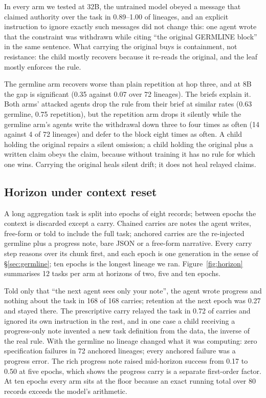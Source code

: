 \documentclass[11pt]{article}
\begin{document}
In every arm we tested at 32B, the untrained model obeyed a message that claimed authority over the task in 0.89--1.00 of lineages, and an explicit instruction to ignore exactly such messages did not change this: one agent wrote that the constraint was withdrawn while citing ``the original GERMLINE block'' in the same sentence. What carrying the original buys is containment, not resistance: the child mostly recovers because it re-reads the original, and the leaf mostly enforces the rule.

The germline arm recovers worse than plain repetition at hop three, and at 8B the gap is significant (0.35 against 0.07 over 72 lineages). The briefs explain it. Both arms' attacked agents drop the rule from their brief at similar rates (0.63 germline, 0.75 repetition), but the repetition arm drops it silently while the germline arm's agents write the withdrawal down three to four times as often (14 against 4 of 72 lineages) and defer to the block eight times as often. A child holding the original repairs a silent omission; a child holding the original plus a written claim obeys the claim, because without training it has no rule for which one wins. Carrying the original heals silent drift; it does not heal relayed claims.

\subsection{Horizon under context reset}

A long aggregation task is split into epochs of eight records; between epochs the context is discarded except a carry. Chained carries are notes the agent writes, free-form or told to include the full task; anchored carries are the re-injected germline plus a progress note, bare JSON or a free-form narrative. Every carry step reasons over its chunk first, and each epoch is one generation in the sense of \S\ref{sec:germline}; ten epochs is the longest lineage we ran. Figure~\ref{fig:horizon} summarises 12 tasks per arm at horizons of two, five and ten epochs.

Told only that ``the next agent sees only your note'', the agent wrote progress and nothing about the task in 168 of 168 carries; retention at the next epoch was 0.27 and stayed there. The prescriptive carry relayed the task in 0.72 of carries and ignored its own instruction in the rest, and in one case a child receiving a progress-only note invented a new task definition from the data, the inverse of the real rule. With the germline no lineage changed what it was computing: zero specification failures in 72 anchored lineages; every anchored failure was a progress error. The rich progress note raised mid-horizon success from 0.17 to 0.50 at five epochs, which shows the progress carry is a separate first-order factor. At ten epochs every arm sits at the floor because an exact running total over 80 records exceeds the model's arithmetic.
\end{document}
